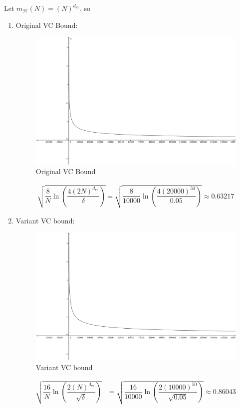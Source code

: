 \documentclass[12pt]{article}
\newcommand{\ParTh}[1]{\left(#1\right)}
\begin{document}
Let $m_{\mathcal{H}}\ParTh{N}=\ParTh{N}^{d_{\text{vc}}}$, so
\begin{enumerate}
\item Original VC Bound:
\begin{figure}[h]
	\centering
	\includegraphics[scale=0.5]{OVCBound.png}
	\caption{Original VC Bound}
	\label{4-1}
\end{figure}
\begin{align}
\sqrt{\dfrac{8}{N}\ln\ParTh{\dfrac{4\ParTh{2N}^{d_{\text{vc}}}}{\delta}}}=\sqrt{\dfrac{8}{10000}\ln\ParTh{\dfrac{4\ParTh{20000}^{50}}{0.05}}}\approx0.63217
\end{align}
\item Variant VC bound:
\begin{figure}[h]
	\centering
	\includegraphics[scale=0.5]{VVCBound.png}
	\caption{Variant VC bound}
	\label{4-2}
\end{figure}
\begin{align}
	\sqrt{\dfrac{16}{N}\ln\ParTh{\dfrac{2\ParTh{N}^{d_{\text{vc}}}}{\sqrt{\delta}}}}&=\sqrt{\dfrac{16}{10000}\ln\ParTh{\dfrac{2\ParTh{10000}^{50}}{\sqrt{0.05}}}}\approx0.86043

\end{align}
\end{enumerate}
\end{document}

